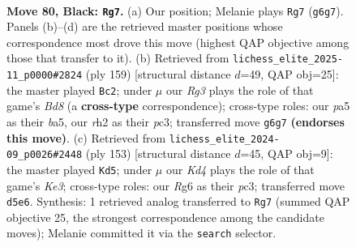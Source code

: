 \documentclass[11pt]{article}
\begin{document}
\clearpage

\begin{figure}[p]\centering
\begin{subfigure}{0.46\textwidth}\centering
\resizebox{\linewidth}{!}{%
\newchessgame
\chessboard[
  setfen={8/8/p5r1/Pppk1p1p/2p2P1P/4PKP1/1P5R/8 b - - 6 80},
  showmover=false,
  pgfstyle=straightmove, color=movearrow, markmove={g6-g7}
]}
\caption{}
\end{subfigure}\hfill
\begin{subfigure}{0.46\textwidth}\centering
\resizebox{\linewidth}{!}{%
\newchessgame
\chessboard[
  setfen={8/5kp1/p4p1p/Bp1p3P/3P2P1/P1P2PK1/8/3b4 b - - 40 80},
  showmover=false,
  pgfstyle=straightmove, color=movearrow, markmove={d1-c2}
]}
\caption{}
\end{subfigure}
\\[4pt]
\begin{subfigure}{0.46\textwidth}\centering
\resizebox{\linewidth}{!}{%
\newchessgame
\chessboard[
  setfen={8/8/2p1kp2/1p3p1p/1P1Pp2P/2P1K1P1/5P2/8 b - - 3 77},
  showmover=false,
  pgfstyle=straightmove, color=movearrow, markmove={e6-d5}
]}
\caption{}
\end{subfigure}\hfill

\caption{\textbf{Move 80, Black: \texttt{Rg7}.} (a) Our position; Melanie plays \texttt{Rg7} (\texttt{g6g7}). Panels (b)--(d) are the retrieved master positions whose correspondence most drove this move (highest QAP objective among those that transfer to it). (b) Retrieved from \texttt{lichess\_elite\_2025-11\_p0000\#2824} (ply 159) [structural distance $d$=49, QAP obj=25]: the master played \texttt{Bc2}; under $\mu$ our \emph{Rg3} plays the role of that game's \emph{Bd8} (a \textbf{cross-type} correspondence); cross-type roles: our \emph{p}a5 as their \emph{b}a5, our \emph{r}h2 as their \emph{p}c3; transferred move \texttt{g6g7} \textbf{(endorses this move)}. (c) Retrieved from \texttt{lichess\_elite\_2024-09\_p0026\#2448} (ply 153) [structural distance $d$=45, QAP obj=9]: the master played \texttt{Kd5}; under $\mu$ our \emph{Kd4} plays the role of that game's \emph{Ke3}; cross-type roles: our \emph{R}g6 as their \emph{p}c3; transferred move \texttt{d5e6}. Synthesis: 1 retrieved analog transferred to \texttt{Rg7} (summed QAP objective 25, the strongest correspondence among the candidate moves); Melanie committed it via the \texttt{search} selector.}
\label{fig:thought-m159}
\end{figure}

\clearpage
\end{document}
